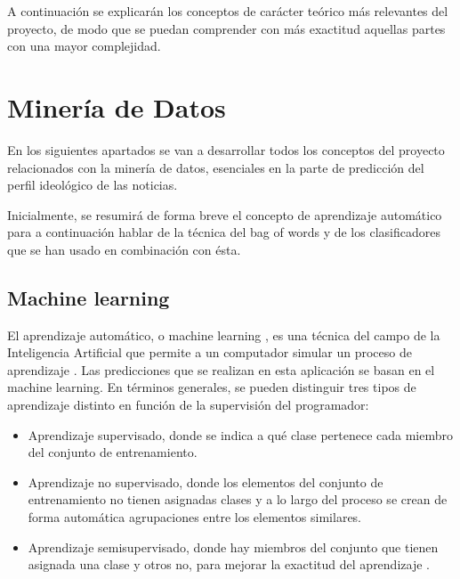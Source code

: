 A continuación se explicarán los conceptos de carácter teórico más relevantes del proyecto, de modo que se puedan comprender con más exactitud aquellas partes con una mayor complejidad.


\section{Minería de Datos}

En los siguientes apartados se van a desarrollar todos los conceptos del proyecto relacionados con la minería de datos, esenciales en la parte de predicción del perfil ideológico de las noticias.

Inicialmente, se resumirá de forma breve el concepto de aprendizaje automático para a continuación hablar de la técnica del bag of words y de los clasificadores que se han usado en combinación con ésta.

\subsection{Machine learning}

El aprendizaje automático, o machine learning \cite{andrieu2003introduction}, es una técnica del campo de la Inteligencia Artificial que permite a un computador simular un proceso de aprendizaje \cite{wiki:machinelearning}. Las predicciones que se realizan en esta aplicación se basan en el machine learning. En términos generales, se pueden distinguir tres tipos de aprendizaje distinto en función de la supervisión del programador:

\begin{itemize}

\item Aprendizaje supervisado, donde se indica a qué clase pertenece cada miembro del conjunto de entrenamiento.

\item Aprendizaje no supervisado, donde los elementos del conjunto de entrenamiento no tienen asignadas clases y a lo largo del proceso se crean de forma automática 
agrupaciones entre los elementos similares.

\item Aprendizaje semisupervisado, donde hay miembros del conjunto que tienen asignada una clase y otros no, para mejorar la exactitud del aprendizaje \cite{wiki:semisupervised}.

\end{itemize}

